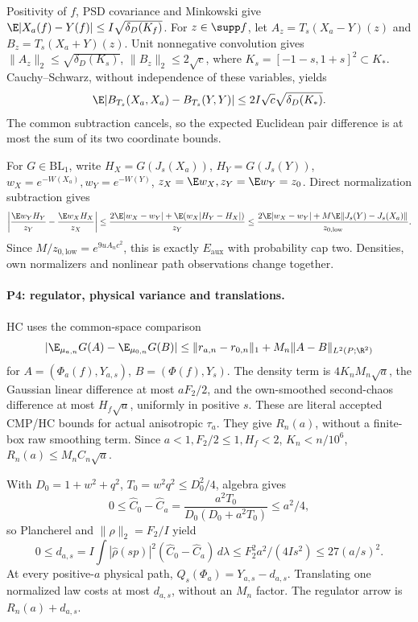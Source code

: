 Positivity of $f$, PSD covariance and Minkowski give
$\E|X_a(f)-Y(f)|\le I\sqrt{\delta_D(K_f)}$.
For $z\in\supp f$, let $A_z=T_s(X_a-Y)(z)$ and $B_z=T_s(X_a+Y)(z)$.
Unit nonnegative convolution gives
$\|A_z\|_2\le\sqrt{\delta_D(K_s)}$,
$\|B_z\|_2\le2\sqrt c$, where $K_s=[-1-s,1+s]^2\subset K_*$.
Cauchy--Schwarz, without independence of these variables, yields
\[
 \E|B_{T_s}(X_a,X_a)-B_{T_s}(Y,Y)|
 \le2I\sqrt c\sqrt{\delta_D(K_*)}.
\]
The common subtraction cancels, so the expected Euclidean pair difference
is at most the sum of its two coordinate bounds.

For $G\in\mathrm{BL}_1$, write $H_X=G(J_s(X_a))$, $H_Y=G(J_s(Y))$,
$w_X=e^{-W(X_a)},w_Y=e^{-W(Y)}$, $z_X=\E w_X,z_Y=\E w_Y=z_0$.
Direct normalization subtraction gives
\[
 \left|\frac{\E w_YH_Y}{z_Y}-\frac{\E w_XH_X}{z_X}\right|
 \le\frac{2\E|w_X-w_Y|+\E(w_X|H_Y-H_X|)}{z_Y}
 \le\frac{2\E|w_X-w_Y|+M\E\|J_s(Y)-J_s(X_a)\|}{z_{0,\mathrm{low}}}.
\]
Since $M/z_{0,\mathrm{low}}=e^{9uA_nc^2}$, this is exactly
$E_{\mathrm{aux}}$ with probability cap two. Densities, own normalizers
and nonlinear path observations change together.

\paragraph{P4: regulator, physical variance and translations.}
HC uses the common-space comparison
\[
 |\E_{\mu_{a,n}}G(A)-\E_{\mu_{0,n}}G(B)|
 \le\|r_{a,n}-r_{0,n}\|_1+M_n\|A-B\|_{L^2(P;\R^2)}
\]
for $A=(\Phi_a(f),Y_{a,s})$, $B=(\Phi(f),Y_s)$.
The density term is $4K_nM_n\sqrt a$, the Gaussian linear difference
at most $aF_2/2$, and the own-smoothed second-chaos difference at most
$H_f\sqrt a$, uniformly in positive $s$. These are literal accepted
CMP/HC bounds for actual anisotropic $\tau_a$. They give $R_n(a)$,
without a finite-box raw smoothing term. Since $a<1,F_2/2\le1,H_f<2$,
$K_n<n/10^6$, $R_n(a)\le M_nC_n\sqrt a$.

With $D_0=1+w^2+q^2$, $T_0=w^2q^2\le D_0^2/4$, algebra gives
\[
 0\le\hat C_0-\hat C_a=\frac{a^2T_0}{D_0(D_0+a^2T_0)}\le a^2/4,
\]
so Plancherel and $\|\rho\|_2=F_2/I$ yield
\[
 0\le d_{a,s}=I\int|\hat\rho(sp)|^2(\hat C_0-\hat C_a)\,d\lambda
 \le F_2^2a^2/(4Is^2)\le27(a/s)^2 .
\]
At every positive-$a$ physical path,
$Q_s(\Phi_a)=Y_{a,s}-d_{a,s}$. Translating one normalized law costs
at most $d_{a,s}$, without an $M_n$ factor. The regulator arrow is
$R_n(a)+d_{a,s}$.


